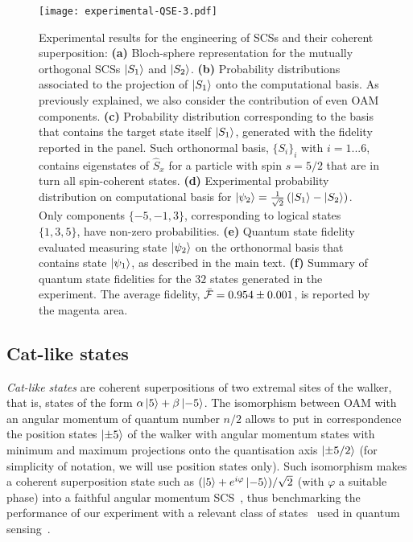 \begin{figure}[tb]
\texttt{[image: experimental-QSE-3.pdf]}
\caption{
	Experimental results for the engineering of \acp{SCS} and their coherent superposition:
	\textbf{(a)} Bloch-sphere representation for the mutually orthogonal \acp{SCS} $\ket{S_1}$ and $\ket{S_2}$.
	\textbf{(b)} Probability distributions associated to the projection of $\ket{S_1}$ onto the computational basis. As previously explained, we also consider the contribution of even \ac{OAM} components.
	\textbf{(c)} Probability distribution corresponding to the basis that contains the target state itself $\ket{S_1}$, generated with the fidelity reported in the panel. Such orthonormal basis, $\{S_i\}_i$ with $i=1 ...6$, contains eigenstates of $\hat{S}_x$ for a particle with spin $s=5/2$ that are in turn all spin-coherent states.
	\textbf{(d)} Experimental probability distribution on computational basis for $\ket{\psi_2}=\frac{1}{\sqrt{2}}\left(\ket{S_1}- \ket{S_2} \right)$. Only components $\{-5, -1, 3\}$, corresponding to logical states $\{1,3,5\}$, have non-zero probabilities.
	\textbf{(e)} Quantum state fidelity evaluated measuring state $\ket{\psi_2}$ on the orthonormal basis that contains state $\ket{\psi_1}$, as described in the main text. 
	\textbf{(f)} Summary of quantum state fidelities for the $32$ states generated in the experiment. The average fidelity, $\bar{{\mathcal{F}}}=0.954\pm 0.001$, is reported by the magenta area.
}
\label{fig:VVBs:figSpin}
\end{figure}

\subsection{Cat-like states}
\label{subsec:expQWs:catstates}

\emph{Cat-like states} are coherent superpositions of two extremal sites of the walker, that is, states of the form $\alpha\ket{5}+\beta\ket{-5}$. The isomorphism between \ac{OAM} with an angular momentum of quantum number $n/2$ allows to put in correspondence the position states $\ket{\pm 5}$ of the walker with angular momentum states with minimum and maximum projections onto the quantisation axis $\ket{\pm 5/2}$ (for simplicity of notation, we will use position states only). Such isomorphism makes a coherent superposition state such as $(\ket{5}+e^{i\varphi}\ket{-5})/\sqrt{2}$ (with $\varphi$ a suitable phase) into a faithful angular momentum SCS~\cite{militello2006distilling}, thus benchmarking the performance of our experiment with a relevant class of states~\cite{chandrashekar2008optimizing,zhang2016creating,majury2018robust} used in quantum sensing~\cite{fickler2012quantum,dambrosio2013photonic}.

